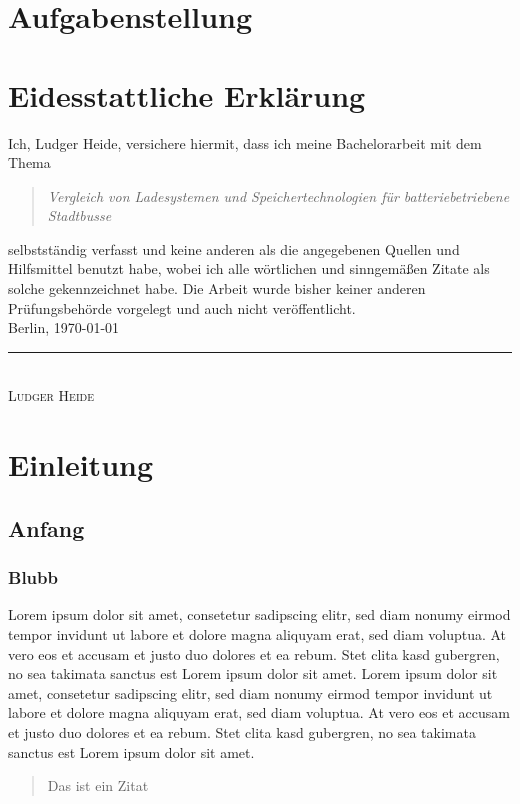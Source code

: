 \documentclass[twoside]{scrreprt}
\begin{document}
\chapter*{Aufgabenstellung}

\chapter*{Eidesstattliche Erklärung}
Ich, Ludger Heide, versichere hiermit, dass ich meine Bachelorarbeit mit dem Thema
\begin{quote}
	\emph{Vergleich von Ladesystemen und Speichertechnologien für batteriebetriebene Stadtbusse}
\end{quote}
selbstständig verfasst und keine anderen als die angegebenen Quellen und Hilfsmittel benutzt habe, wobei ich alle wörtlichen und sinngemäßen Zitate als solche gekennzeichnet habe. Die Arbeit wurde bisher keiner anderen Prüfungsbehörde vorgelegt und auch nicht veröffentlicht.\\[6ex]
Berlin, \today\\
\newline
\rule{4cm}{0.5pt}\\
\textsc{Ludger Heide} 

\tableofcontents

\listoffigures

\listoftables
\newpage

\chapter{Einleitung}
\section{Anfang}
\subsection{Blubb}
Lorem ipsum dolor sit amet, consetetur sadipscing elitr, sed diam nonumy eirmod tempor invidunt ut labore et dolore magna aliquyam erat, sed diam voluptua. At vero eos et accusam et justo duo dolores et ea rebum. Stet clita kasd gubergren, no sea takimata sanctus est Lorem ipsum dolor sit amet. Lorem ipsum dolor sit amet, consetetur sadipscing elitr, sed diam nonumy eirmod tempor invidunt ut labore et dolore magna aliquyam erat, sed diam voluptua. At vero eos et accusam et justo duo dolores et ea rebum. Stet clita kasd gubergren, no sea takimata sanctus est Lorem ipsum dolor sit amet.
\begin{quote}
	Das ist ein Zitat \cite{Association:2005}
\end{quote}
\end{document}
